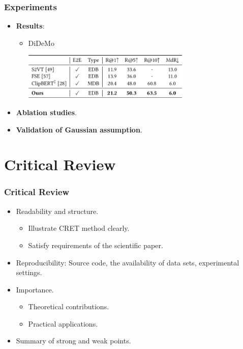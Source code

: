 \documentclass[notes, 10pt, aspectratio=169]{beamer}
\begin{document}
\begin{frame}
    \frametitle{Experiments}
    \begin{itemize}
        \item \textbf{Results}:
    \begin{itemize}
        \item DiDeMo
            \begin{center}
                \includegraphics[width=8cm]{didemo.png}
            \end{center}
    \end{itemize}
\item \textbf{Ablation studies}.
\item \textbf{Validation of Gaussian assumption}.
    \end{itemize}
\end{frame}

\section{Critical Review}
\begin{frame}
    \frametitle{Critical Review} 
    \begin{itemize}
        \item Readability and structure.
            \begin{itemize}
                \item Illustrate CRET method clearly.
                \item Satisfy requirements of the scientific paper.
            \end{itemize}
        \item Reproducibility: Source code, the availability of data sets, experimental settings.
        \item Importance.
            \begin{itemize}
                \item Theoretical contributions.
                \item Practical applications.
            \end{itemize}
        \item Summary of strong and weak points.
    \end{itemize}
\end{frame}
\end{document}
